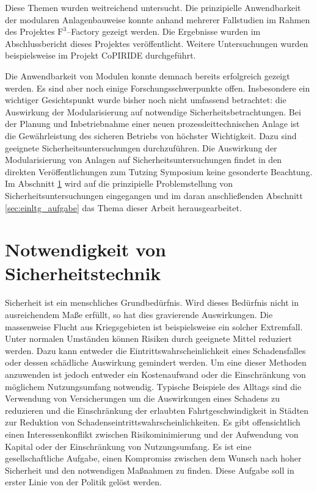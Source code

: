 Diese Themen wurden weitreichend untersucht. Die prinzipielle Anwendbarkeit der modularen Anlagenbauweise konnte anhand mehrerer Fallstudien im Rahmen des Projektes $\text{F}^{3}$--Factory gezeigt werden. Die Ergebnisse wurden im Abschlussbericht dieses Projektes \cite{f3_2014} ver\"offentlicht. \linebreak
Weitere Untersuchungen wurden beispielsweise im Projekt CoPIRIDE \cite{copiride_2014} durchgef\"uhrt.

Die Anwendbarkeit von Modulen konnte demnach bereits erfolgreich gezeigt werden. Es sind aber noch einige Forschungsschwerpunkte offen. Insbesondere ein wichtiger Gesichtspunkt wurde bisher noch nicht umfassend betrachtet: die Auswirkung der Modularisierung auf notwendige Sicherheitsbetrachtungen. \linebreak
Bei der Planung und Inbetriebnahme einer neuen prozessleittechnischen Anlage ist die Gew\"ahrleistung des sicheren Betriebs von h\"ochster Wichtigkeit. Dazu sind geeignete Sicherheitsuntersuchungen durchzuf\"uhren. Die Auswirkung der Modularisierung von Anlagen auf Sicherheitsuntersuchungen findet in den direkten Ver\"offentlichungen zum Tutzing Symposium keine gesonderte Beachtung. Im Abschnitt \ref{sec:einltg_sicherheitstechnik} wird auf die prinzipielle Problemstellung von Sicherheitsuntersuchungen eingegangen und im daran anschlie\ss{}enden Abschnitt \ref{sec:einltg_aufgabe} das Thema dieser Arbeit herausgearbeitet. 

\section{Notwendigkeit von Sicherheitstechnik} \label{sec:einltg_sicherheitstechnik}
Sicherheit ist ein menschliches Grundbed\"urfnis. Wird dieses Bed\"urfnis nicht in ausreichendem Ma\ss{}e erf\"ullt, so hat dies gravierende Auswirkungen. Die massenweise Flucht aus Kriegsgebieten ist beispielsweise ein solcher Extremfall. \linebreak
Unter normalen Umst\"anden k\"onnen Risiken durch geeignete Mittel reduziert werden. Dazu kann entweder die Eintrittswahrscheinlichkeit eines Schadensfalles oder dessen sch\"adliche Auswirkung gemindert werden. Um eine dieser Methoden anzuwenden ist jedoch entweder ein Kostenaufwand oder die Einschr\"ankung von m\"oglichem Nutzungsumfang notwendig. Typische Beispiele des Alltags sind die Verwendung von Versicherungen um die Auswirkungen eines Schadens zu reduzieren und die Einschr\"ankung der erlaubten Fahrtgeschwindigkeit in St\"adten zur Reduktion von Schadenseintrittswahrscheinlichkeiten. Es gibt offensichtlich einen Interessenkonflikt zwischen Risikominimierung und der Aufwendung von Kapital oder der Einschr\"ankung von Nutzungsumfang. \linebreak
Es ist eine gesellschaftliche Aufgabe, einen Kompromiss zwischen dem Wunsch nach hoher Sicherheit und den notwendigen Ma\ss{}nahmen zu finden. Diese Aufgabe soll in erster Linie von der Politik gel\"ost werden.

